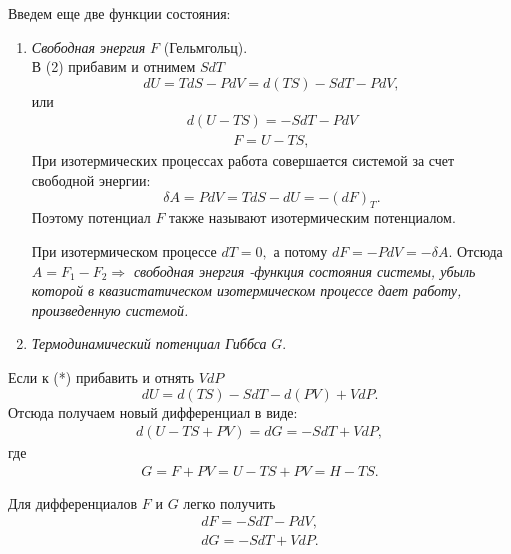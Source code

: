 \documentclass[14pt,a4paper]{scrartcl}
\begin{document}
	\quad Введем еще две функции состояния: 
	\begin{enumerate}
		\item \textit{Свободная энергия} $F$ (Гельмгольц). \\
		В (2) прибавим и отнимем $SdT$
		$$dU = TdS - PdV = d(TS) - SdT - PdV,$$ или
		\begin{align}
		d(U-TS) = -SdT - PdV \tag{*}
		\end{align}
		\begin{align}
		F = U - TS, \tag{4}
		\end{align}
		При изотермических процессах работа совершается системой за счет свободной энергии: 
		$$\delta A = PdV = TdS - dU = -(dF)_T.$$
		Поэтому потенциал $F$ также называют изотермическим потенциалом.
	
	
	\quad При изотермическом процессе $dT = 0,$ а потому $dF = -PdV = -\delta A$. Отсюда $A =F_1 - F_2 \Rightarrow$ \textit{свободная энергия -функция состояния системы, убыль которой в квазистатическом изотермическом процессе дает работу, произведенную системой.}
		
		\item  \textit{Термодинамический потенциал Гиббса} $G$.
	\end{enumerate}

	Если к (*) прибавить и отнять $VdP$
	$$dU = d(TS) -SdT - d(PV) + VdP.$$
	Отсюда получаем новый дифференциал в виде:
	\begin{align}
	d(U-TS +PV) = dG = -SdT +VdP, \tag{**}
	\end{align}
	где
	\begin{align}
	G = F + PV = U -TS +PV = H - TS.\tag{5}
	\end{align}

	Для дифференциалов $F$ и $G$ легко получить
	\begin{align}
	dF = -SdT -PdV,\tag{6}
	\end{align}
	\begin{align}
	dG = -SdT +VdP. \tag{7}
	\end{align}
\end{document}
